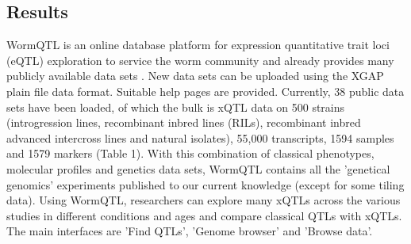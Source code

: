 \subsection{Results}
WormQTL is an online database platform for expression quantitative trait loci (eQTL) exploration 
to service the worm community and already provides many publicly available data sets \cite{Rockman:2010, 
Doroszuk:2009, Li:2006, Li:2010, Gutteling:2007, Vinuela:2010, Elvin:2011, Vinuela:2012}. New data 
sets can be uploaded using the XGAP plain file data format. Suitable help pages are provided. 
Currently, 38 public data sets have been loaded, of which the bulk is xQTL data on 500 strains 
(introgression lines, recombinant inbred lines (RILs), recombinant inbred advanced intercross lines 
and natural isolates), 55,000 transcripts, 1594 samples and 1579 markers (Table 1). With this 
combination of classical phenotypes, molecular profiles and genetics data sets, WormQTL contains 
all the 'genetical genomics' experiments published to our current knowledge (except for some tiling 
data). Using WormQTL, researchers can explore many xQTLs across the various studies in different 
conditions and ages and compare classical QTLs with xQTLs. The main interfaces are 'Find QTLs', 
'Genome browser' and 'Browse data'.


